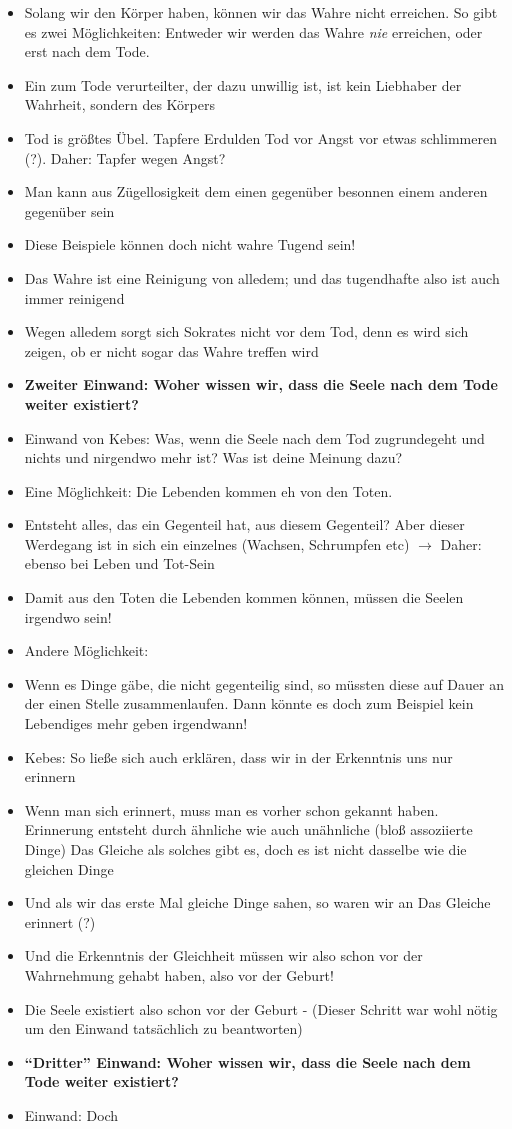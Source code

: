 \documentclass[emulatestandardclasses]{scrartcl}
\begin{document}
\begin{itemize}
  \item Solang wir den Körper haben, können wir das Wahre nicht erreichen. So gibt es zwei Möglichkeiten: Entweder wir werden das Wahre \emph{nie} erreichen, oder erst nach dem Tode.
  \item Ein zum Tode verurteilter, der dazu unwillig ist, ist kein Liebhaber der Wahrheit, sondern des Körpers
  \item Tod is größtes Übel. Tapfere Erdulden Tod vor Angst vor etwas schlimmeren (?). Daher: Tapfer wegen Angst?  
  \item Man kann aus Zügellosigkeit dem einen gegenüber besonnen einem anderen gegenüber sein
  \item Diese Beispiele können doch nicht wahre Tugend sein!
  \item Das Wahre ist eine Reinigung von alledem; und das tugendhafte also ist auch immer reinigend
  \item Wegen alledem sorgt sich Sokrates nicht vor dem Tod, denn es wird sich zeigen, ob er nicht sogar das Wahre treffen wird 
  \item \textbf{Zweiter Einwand: Woher wissen wir, dass die Seele nach dem Tode weiter existiert?}
  \item Einwand von Kebes: Was, wenn die Seele nach dem Tod zugrundegeht und nichts und nirgendwo mehr ist? Was ist deine Meinung dazu?
  \item Eine Möglichkeit: Die Lebenden kommen eh von den Toten.
  \item Entsteht alles, das ein Gegenteil hat, aus diesem Gegenteil? Aber dieser Werdegang ist in sich ein einzelnes (Wachsen, Schrumpfen etc) $\rightarrow$ Daher: ebenso bei Leben und Tot-Sein
  \item Damit aus den Toten die Lebenden kommen können, müssen die Seelen irgendwo sein!
  \item Andere Möglichkeit:
  \item Wenn es Dinge gäbe, die nicht gegenteilig sind, so müssten diese auf Dauer an der einen Stelle zusammenlaufen. Dann könnte es doch zum Beispiel kein Lebendiges mehr geben irgendwann!
  \item Kebes: So ließe sich auch erklären, dass wir in der Erkenntnis uns nur erinnern
  \item Wenn man sich erinnert, muss man es vorher schon gekannt haben. Erinnerung entsteht durch ähnliche wie auch unähnliche (bloß assoziierte Dinge) Das Gleiche als solches gibt es, doch es ist nicht dasselbe wie die gleichen Dinge
  \item Und als wir das erste Mal gleiche Dinge sahen, so waren wir an Das Gleiche erinnert (?)
  \item Und die Erkenntnis der Gleichheit müssen wir also schon vor der Wahrnehmung gehabt haben, also vor der Geburt! 
  \item Die Seele existiert also schon vor der Geburt - (Dieser Schritt war wohl nötig um den Einwand tatsächlich zu beantworten)
  \item \textbf{"`Dritter"' Einwand: Woher wissen wir, dass die Seele nach dem Tode weiter existiert?}
  \item Einwand: Doch 
\end{itemize}
\end{document}
